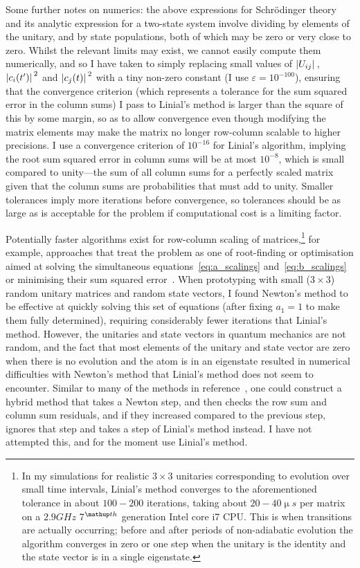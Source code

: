 Some further notes on numerics: the above expressions for Schr\"odinger theory and its analytic expression for a two-state system involve dividing by elements of the unitary, and by state populations, both of which may be zero or very close to zero. Whilst the relevant limits may exist, we cannot easily compute them numerically, and so I have taken to simply replacing small values of $\abs{U_{ij}}$, $\abs{c_i(t^\prime)}^2$ and $\abs{c_j(t)}^2$ with a tiny non-zero constant (I use $\varepsilon=10^{-100}$), ensuring that the convergence criterion (which represents a tolerance for the sum squared error in the column sums) I pass to Linial's method is larger than the square of this by some margin, so as to allow convergence even though modifying the matrix elements may make the matrix no longer row-column scalable to higher precisions. I use a convergence criterion of $10^{-16}$ for Linial's algorithm, implying the root sum squared error in column sums will be at most $10^{-8}$, which is small compared to unity---the sum of all column sums for a perfectly scaled matrix given that the column sums are probabilities that must add to unity. Smaller tolerances imply more iterations before convergence, so tolerances should be as large as is acceptable for the problem if computational cost is a limiting factor.

Potentially faster algorithms exist for row-column scaling of matrices,\footnote{In my simulations for realistic $3\times3$ unitaries corresponding to evolution over small time intervals, Linial's method converges to the aforementioned tolerance in about $100-200$ iterations, taking about $20-40\unit{\upmu s}$ per matrix on a $2.9\unit{GHz}$ 7$^\up{th}$ generation Intel core i7 \textsc{CPU}. This is when transitions are actually occurring; before and after periods of non-adiabatic evolution the algorithm converges in zero or one step when the unitary is the identity and the state vector is in a single eigenstate.} for example, approaches that treat the problem as one of root-finding or optimisation aimed at solving the simultaneous equations~\eqref{eq:a_scalings} and~\eqref{eq:b_scalings} or minimising their sum squared error~\cite{knight_fast_2013}. When prototyping with small ($3\times 3$) random unitary matrices and random state vectors, I found Newton's method to be effective at quickly solving this set of equations (after fixing $a_1=1$ to make them fully determined), requiring considerably fewer iterations that Linial's method. However, the unitaries and state vectors in quantum mechanics are not random, and the fact that most elements of the unitary and state vector are zero when there is no evolution and the atom is in an eigenstate resulted in numerical difficulties with Newton's method that Linial's method does not seem to encounter. Similar to many of the methods in reference~\cite{knight_fast_2013}, one could construct a hybrid method that takes a Newton step, and then checks the row sum and column sum residuals, and if they increased compared to the previous step, ignores that step and takes a step of Linial's method instead. I have not attempted this, and for the moment use Linial's method.

